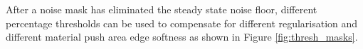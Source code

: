 After a noise mask has eliminated the steady state noise floor, different percentage thresholds can be used to compensate for different regularisation and different material push area edge softness as shown in Figure \ref{fig:thresh_masks}.
\begin{figure}[H]
\centering
    \begin{minipage}[t]{.2\textwidth}
        \vspace{0pt}
        \vfill

\end{minipage}
\end{figure}
